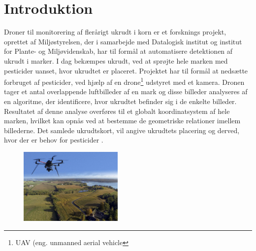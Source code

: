 \chapter{Introduktion} \label{sec:intro}
Droner til monitorering af flerårigt ukrudt i korn er et forsknings projekt, oprettet af Miljøstyrelsen, der i samarbejde med Datalogisk institut og institut for Plante- og Miljøvidenskab, har til formål at automatisere detektionen af ukrudt i marker. I dag bekæmpes ukrudt, ved at sprøjte hele marken med pesticider uanset, hvor ukrudtet er placeret. Projektet har til formål at nedsætte forbruget af pesticider, ved hjælp af en drone\footnote{UAV (eng. unmanned aerial vehicle} udstyret med et kamera. Dronen tager et antal overlappende luftbilleder af en mark og disse billeder analyseres af en algoritme, der identificere, hvor ukrudtet befinder sig i de enkelte billeder. Resultatet af denne analyse overføres til et globalt koordinatsystem af hele marken, hvilket kan opnås ved at bestemme de geometriske relationer imellem billederne. Det samlede ukrudtskort, vil angive ukrudtets placering og derved, hvor der er behov for pesticider \cite{drone}.
\begin{figure}[H]
    \centering
    \includegraphics[width=0.45\textwidth]{fig/drone4.jpg}
     \vspace{-0.5em}
    \begin{center}    
       \caption{\textcolor{gray}{\footnotesize \textit{ }}}
    \label{fig:difference}
     \end{center}
     \vspace{-3em}
  \end{figure} \noindent
